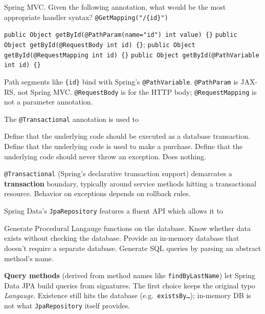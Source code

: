 \question[4]
Spring MVC. Given the following annotation, what would be the most appropriate handler syntax?
\texttt{@GetMapping("/\{id\}")}
\begin{choices}
  \choice \texttt{public Object getById(@PathParam(name="id") int value) \{\}}
  \choice \texttt{public Object getById(@RequestBody int id) \{\}};
  \choice \texttt{public Object getById(@RequestMapping int id) \{\}}
  \CorrectChoice \texttt{public Object getById(@PathVariable int id) \{\}}
\end{choices}
\begin{solution}
  Path segments like \texttt{\{id\}} bind with Spring's \texttt{@PathVariable}. \texttt{@PathParam} is JAX-RS, not Spring MVC. \texttt{@RequestBody} is for the HTTP body; \texttt{@RequestMapping} is not a parameter annotation.
\end{solution}

\question[4]
The \texttt{@Transactional} annotation is used to
\begin{choices}
  \CorrectChoice Define that the underlying code should be executed as a database transaction.
  \choice Define that the underlying code is used to make a purchase.
  \choice Define that the underlying code should never throw an exception.
  \choice Does nothing.
\end{choices}
\begin{solution}
  \texttt{@Transactional} (Spring's declarative transaction support) demarcates a \textbf{transaction} boundary, typically around service methods hitting a transactional resource. Behavior on exceptions depends on rollback rules.
\end{solution}

\question[4]
Spring Data's \texttt{JpaRepository} features a fluent API which allows it to
\begin{choices}
  \choice Generate Procedural Langauge functions on the database.
  \choice Know whether data exists without checking the database.
  \choice Provide an in-memory database that doesn't require a separate database.
  \CorrectChoice Generate SQL queries by parsing an abstract method's name.
\end{choices}
\begin{solution}
  \textbf{Query methods} (derived from method names like \texttt{findByLastName}) let Spring Data JPA build queries from signatures. The first choice keeps the original typo \textit{Langauge}. Existence still hits the database (e.g.\ \texttt{existsBy\ldots}); in-memory DB is not what \texttt{JpaRepository} itself provides.
\end{solution}

